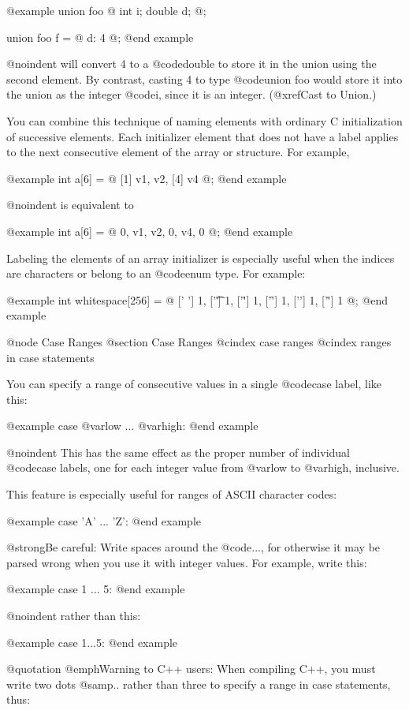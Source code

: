 {@example
union foo @{ int i; double d; @};

union foo f = @{ d: 4 @};
@end example

@noindent
will convert 4 to a @code{double} to store it in the union using
the second element.  By contrast, casting 4 to type @code{union foo}
would store it into the union as the integer @code{i}, since it is
an integer.  (@xref{Cast to Union}.)

You can combine this technique of naming elements with ordinary C
initialization of successive elements.  Each initializer element that
does not have a label applies to the next consecutive element of the
array or structure.  For example,

@example
int a[6] = @{ [1] v1, v2, [4] v4 @};
@end example

@noindent
is equivalent to

@example
int a[6] = @{ 0, v1, v2, 0, v4, 0 @};
@end example

Labeling the elements of an array initializer is especially useful
when the indices are characters or belong to an @code{enum} type.
For example:

@example
int whitespace[256]
  = @{ [' '] 1, ['\t'] 1, ['\h'] 1,
      ['\f'] 1, ['\n'] 1, ['\r'] 1 @};
@end example

@node Case Ranges
@section Case Ranges
@cindex case ranges
@cindex ranges in case statements

You can specify a range of consecutive values in a single @code{case} label,
like this:

@example
case @var{low} ... @var{high}:
@end example

@noindent
This has the same effect as the proper number of individual @code{case}
labels, one for each integer value from @var{low} to @var{high}, inclusive.

This feature is especially useful for ranges of ASCII character codes:

@example
case 'A' ... 'Z':
@end example

@strong{Be careful:} Write spaces around the @code{...}, for otherwise
it may be parsed wrong when you use it with integer values.  For example,
write this:

@example
case 1 ... 5:
@end example

@noindent 
rather than this:

@example
case 1...5:
@end example

@quotation
@emph{Warning to C++ users:} When compiling C++, you must write two dots
@samp{..} rather than three to specify a range in case statements, thus:

}
